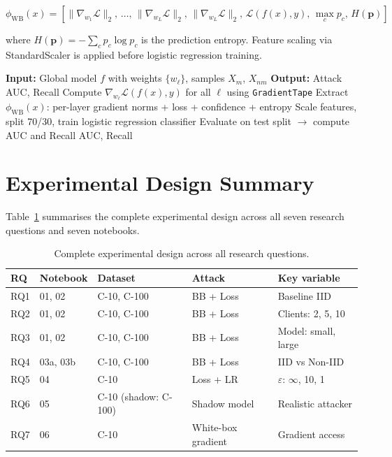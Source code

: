 \documentclass[12pt, a4paper]{report}
\begin{document}
\begin{equation}
  \phi_{\text{WB}}(x) = \left[ \|\nabla_{w_1}\mathcal{L}\|_2,\,
  \ldots,\, \|\nabla_{w_L}\mathcal{L}\|_2,\,
  \|\nabla_{w_L}\mathcal{L}\|_2,\,
  \mathcal{L}(f(x),y),\, \max_c p_c,\, H(\mathbf{p}) \right]
\end{equation}

\noindent where $H(\mathbf{p}) = -\sum_c p_c \log p_c$ is the prediction entropy.
Feature scaling via StandardScaler is applied before logistic regression training.

\begin{algorithm}[H]
\caption{White-Box Gradient Membership Inference Attack}
\label{alg:whitebox}
\begin{algorithmic}[1]
\State \textbf{Input:} Global model $f$ with weights $\{w_\ell\}$, samples $X_m$, $X_{nm}$
\State \textbf{Output:} Attack AUC, Recall
    \State Compute $\nabla_{w_\ell} \mathcal{L}(f(x), y)$ for all $\ell$ using \texttt{GradientTape}
    \State Extract $\phi_{\text{WB}}(x)$: per-layer gradient norms + loss + confidence + entropy
\EndFor
\State Scale features, split 70/30, train logistic regression classifier
\State Evaluate on test split $\rightarrow$ compute AUC and Recall
\State \Return AUC, Recall
\end{algorithmic}
\end{algorithm}

\section{Experimental Design Summary}

Table~\ref{tab:exp_design} summarises the complete experimental design across all
seven research questions and seven notebooks.

\begin{table}[H]
  \centering
  \caption{Complete experimental design across all research questions.}
  \label{tab:exp_design}
  \begin{tabular}{lllll}
    \toprule
    \textbf{RQ} & \textbf{Notebook} & \textbf{Dataset} & \textbf{Attack} & \textbf{Key variable} \\
    \midrule
    RQ1 & 01, 02 & C-10, C-100 & BB + Loss & Baseline IID \\
    RQ2 & 01, 02 & C-10, C-100 & BB + Loss & Clients: 2, 5, 10 \\
    RQ3 & 01, 02 & C-10, C-100 & BB + Loss & Model: small, large \\
    RQ4 & 03a, 03b & C-10, C-100 & BB + Loss & IID vs Non-IID \\
    RQ5 & 04 & C-10 & Loss + LR & $\varepsilon$: $\infty$, 10, 1 \\
    RQ6 & 05 & C-10 (shadow: C-100) & Shadow model & Realistic attacker \\
    RQ7 & 06 & C-10 & White-box gradient & Gradient access \\
    \bottomrule
  \end{tabular}
\end{table}
\end{document}
